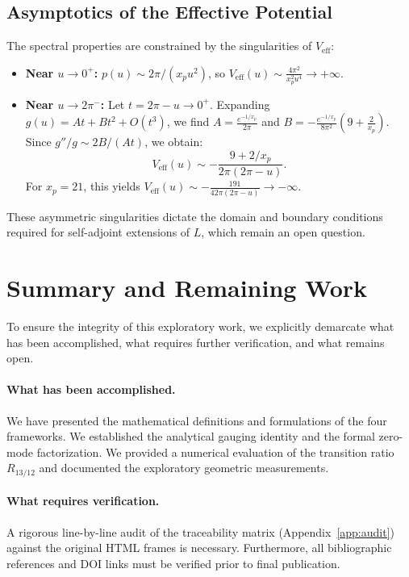\documentclass[11pt,a4paper]{article}
\begin{document}
\subsection{Asymptotics of the Effective Potential}
The spectral properties are constrained by the singularities of \(V_{\text{eff}}\):
\begin{itemize}
    \item \textbf{Near \(u \to 0^{+}\):} \(p(u) \sim 2\pi/(x_p u^2)\), so \(V_{\text{eff}}(u) \sim \frac{4\pi^2}{x_p^2 u^4} \to +\infty\).
    \item \textbf{Near \(u \to 2\pi^{-}\):} Let \(t = 2\pi - u \to 0^+\). Expanding \(g(u) = At + Bt^2 + O(t^3)\), we find \(A = \frac{e^{-1/x_p}}{2\pi}\) and \(B = -\frac{e^{-1/x_p}}{8\pi^2}(9 + \frac{2}{x_p})\). Since \(g''/g \sim 2B/(At)\), we obtain:
    \begin{equation}
    V_{\text{eff}}(u) \sim -\frac{9 + 2/x_p}{2\pi(2\pi - u)}.
    \end{equation}
    For \(x_p = 21\), this yields \(V_{\text{eff}}(u) \sim -\frac{191}{42\pi(2\pi - u)} \to -\infty\).
\end{itemize}
These asymmetric singularities dictate the domain and boundary conditions required for self-adjoint extensions of \(L\), which remain an open question.

\section{Summary and Remaining Work}
\label{sec:summary}

To ensure the integrity of this exploratory work, we explicitly demarcate what has been accomplished, what requires further verification, and what remains open. 

\paragraph{What has been accomplished.}
We have presented the mathematical definitions and formulations of the four frameworks. We established the analytical gauging identity and the formal zero-mode factorization. We provided a numerical evaluation of the transition ratio \(R_{13/12}\) and documented the exploratory geometric measurements. 

\paragraph{What requires verification.}
A rigorous line-by-line audit of the traceability matrix (Appendix~\ref{app:audit}) against the original HTML frames is necessary. Furthermore, all bibliographic references and DOI links must be verified prior to final publication.
\end{document}
